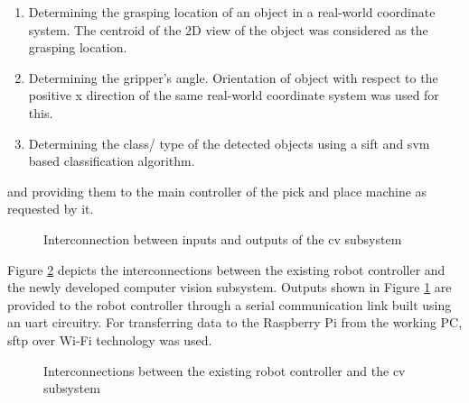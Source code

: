 \documentclass[a4paper,12pt]{report}%
\begin{document}
\begin{enumerate}
	\item Determining the grasping location of an object in a real-world coordinate system. The centroid of the 2D view of the object was considered as the grasping location. 
	
	\item Determining the gripper's angle. Orientation of object with respect to the positive x direction of the same real-world coordinate system was used for this.
	
	\item  Determining the class/ type of the detected objects using a \ac{sift} and \ac{svm} based classification algorithm.
\end{enumerate}

and providing them to the main controller of the pick and place machine as requested by it. 

\begin{figure}[H]
	\centering
	
	\caption{Interconnection between inputs and outputs of the \ac{cv} subsystem}
	\label{fig:ioprocess}
\end{figure}



Figure \ref{fig:cvsubsys} depicts the interconnections between the existing robot controller and the newly developed computer vision subsystem. Outputs shown in Figure \ref{fig:ioprocess} are provided to the robot controller through a serial communication link built using an \ac{uart} circuitry. For transferring data to the Raspberry Pi from the working PC, \ac{sftp} over Wi-Fi technology was used.

\begin{figure}[H]
	\centering
	
	\caption{Interconnections between the existing robot controller and the \ac{cv} subsystem}
	\label{fig:cvsubsys}
\end{figure}
\end{document}

